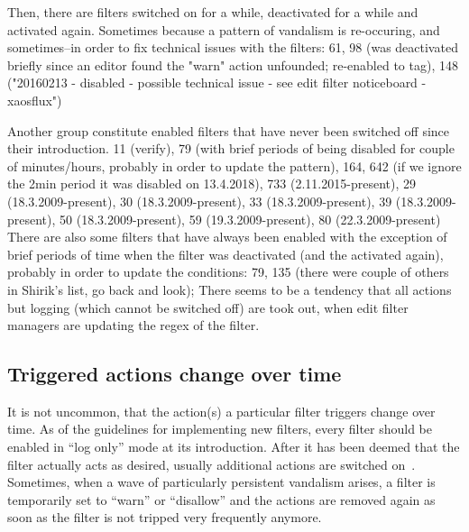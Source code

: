 Then, there are filters switched on for a while, deactivated for a while and activated again.
Sometimes because a pattern of vandalism is re-occuring, and sometimes–in order to fix technical issues with the filters: 61, 98 (was deactivated briefly since an editor found the "warn" action unfounded; re-enabled to tag), 148 ("20160213 - disabled - possible technical issue - see edit filter noticeboard - xaosflux")

Another group constitute enabled filters that have never been switched off since their introduction.
  11 (verify), 79 (with brief periods of being disabled for couple of minutes/hours, probably in order to update the pattern), 164, 642 (if we ignore the 2min period it was disabled on 13.4.2018), 733 (2.11.2015-present), 29 (18.3.2009-present), 30 (18.3.2009-present), 33 (18.3.2009-present), 39 (18.3.2009-present), 50 (18.3.2009-present), 59 (19.3.2009-present), 80 (22.3.2009-present)
There are also some filters that have always been enabled with the exception of brief periods of time when the filter was deactivated (and the activated again), probably in order to update the conditions: 79, 135 (there were couple of others in Shirik's list, go back and look);
There seems to be a tendency that all actions but logging (which cannot be switched off) are took out, when edit filter managers are updating the regex of the filter.

\subsection{Triggered actions change over time}
It is not uncommon, that the action(s) a particular filter triggers change over time.
As of the guidelines for implementing new filters, every filter should be enabled in ``log only'' mode at its introduction.
After it has been deemed that the filter actually acts as desired, usually additional actions are switched on~\cite{Wikipedia:EditFilterInstructions}.
Sometimes, when a wave of particularly persistent vandalism arises, a filter is temporarily set to ``warn'' or ``disallow'' and the actions are removed again as soon as the filter is not tripped very frequently anymore. %

